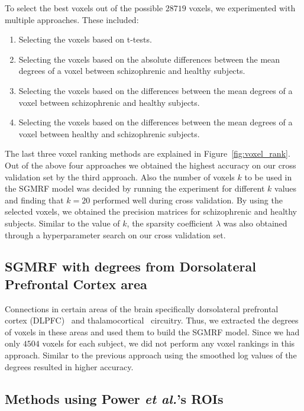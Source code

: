 \documentclass{article} %
\begin{document}
To select the best voxels out of the possible $28719$ voxels, we experimented
with multiple approaches. 
These included: \begin{enumerate}
  \item Selecting the voxels based on t-tests.
  \item Selecting the voxels based on the absolute differences between the mean degrees of a voxel between schizophrenic and healthy subjects.
  \item Selecting the voxels based on the differences between the mean degrees of a voxel between schizophrenic and healthy subjects.
  \item Selecting the voxels based on the differences between the mean degrees of a voxel between healthy and schizophrenic subjects.
\end{enumerate}
The last three voxel ranking methods are explained in Figure~\ref{fig:voxel_rank}. 
Out of the above four approaches we obtained the highest accuracy on our cross 
validation set by the third approach. Also the number of voxels $k$ to be used 
in the SGMRF model was decided by running the experiment for different $k$ 
values and finding that $k = 20$ performed well during cross validation. By using 
the selected voxels, we obtained the precision matrices for schizophrenic and 
healthy subjects. Similar to the value of $k$, the sparsity coefficient 
$\lambda$ was also obtained through a hyperparameter search on our cross 
validation set.


\subsection{SGMRF with degrees from Dorsolateral Prefrontal Cortex area}
Connections in certain areas of the brain specifically dorsolateral 
prefrontal cortex (DLPFC)~\cite{Potkin2008} and 
thalamocortical~\cite{Cheng2015} circuitry. Thus, we extracted the degrees 
of voxels in these areas and used them to build the SGMRF model. Since we 
had only $4504$ voxels for each subject, we did not perform any voxel 
rankings in this approach. Similar to the previous approach using the 
smoothed log values of the degrees resulted in higher accuracy.

\subsection{Methods using Power \emph{et al.}'s ROIs}
\end{document}
